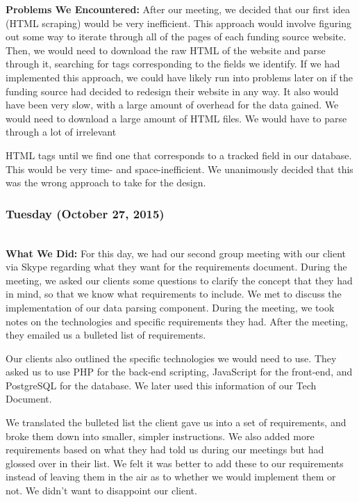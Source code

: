 \documentclass[onecolumn]{IEEEtran}
\begin{document}
    \textbf{Problems We Encountered: } 
    After our meeting, we decided that our first idea (HTML scraping) would be very inefficient. This approach would involve figuring out some way to iterate through all of the pages of each funding source website. Then, we would need to download the raw HTML of the website and parse through it, searching for tags corresponding to the fields we identify. If we had implemented this approach, we could have likely run into problems later on if the funding source had decided to redesign their website in any way. It also would have been very slow, with a large amount of overhead for the data gained. We would need to download a large amount of HTML files. We would have to parse through a lot of irrelevant  

    HTML tags until we find one that corresponds to a tracked field in our database. This would be very time- and space-inefficient. We unanimously decided that this was the wrong approach to take for the design.  

\subsubsection{Tuesday (October 27, 2015)} \hspace*{\fill} \\  
    \textbf{What We Did: }
    For this day, we had our second group meeting with our client via Skype regarding what they want for the requirements document. During the meeting, we asked our clients some questions to clarify the concept that they had in mind, so that we know what requirements to include. We met to discuss the implementation of our data parsing component. During the meeting, we took notes on the technologies and specific requirements they had. After the meeting, they emailed us a bulleted list of requirements.  

    Our clients also outlined the specific technologies we would need to use. They asked us to use PHP for the back-end scripting, JavaScript for the front-end, and PostgreSQL for the database. We later used this information of our Tech Document.  

    We translated the bulleted list the client gave us into a set of requirements, and broke them down into smaller, simpler instructions. We also added more requirements based on what they had told us during our meetings but had glossed over in their list. We felt it was better to add these to our requirements instead of leaving them in the air as to whether we would implement them or not. We didn't want to disappoint our client.  
    
\end{document}
